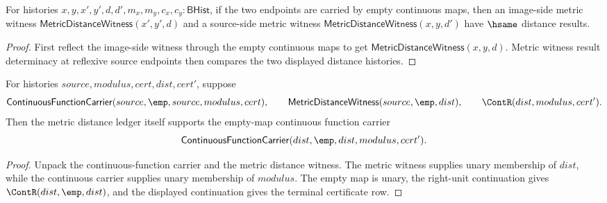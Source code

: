 \begin{theorem}
\label{thm:continuousmap-empty-identity-metric-result-deterministic}
For histories $x,y,x',y',d,d',m_x,m_y,c_x,c_y:\mathsf{BHist}$, if the two
endpoints are carried by empty continuous maps, then an image-side metric
witness $\mathsf{MetricDistanceWitness}(x',y',d)$ and a source-side metric
witness $\mathsf{MetricDistanceWitness}(x,y,d')$ have $\hsame$ distance
results.
\end{theorem}
\begin{proof}
First reflect the image-side witness through the empty continuous maps to get
$\mathsf{MetricDistanceWitness}(x,y,d)$. Metric witness result determinacy at
reflexive source endpoints then compares the two displayed distance histories.
\end{proof}

\begin{theorem}
\label{thm:continuousmap-empty-target-metric-rebased-carrier}
For histories $source,modulus,cert,dist,cert'$, suppose
$$
\mathsf{ContinuousFunctionCarrier}(source,\emp,source,modulus,cert),
\qquad
\mathsf{MetricDistanceWitness}(source,\emp,dist),
\qquad
\ContR(dist,modulus,cert').
$$
Then the metric distance ledger itself supports the empty-map continuous
function carrier
$$
\mathsf{ContinuousFunctionCarrier}(dist,\emp,dist,modulus,cert').
$$
\end{theorem}
\begin{proof}
Unpack the continuous-function carrier and the metric distance witness. The
metric witness supplies unary membership of $dist$, while the continuous
carrier supplies unary membership of $modulus$. The empty map is unary, the
right-unit continuation gives $\ContR(dist,\emp,dist)$, and the displayed
continuation gives the terminal certificate row.
\end{proof}

